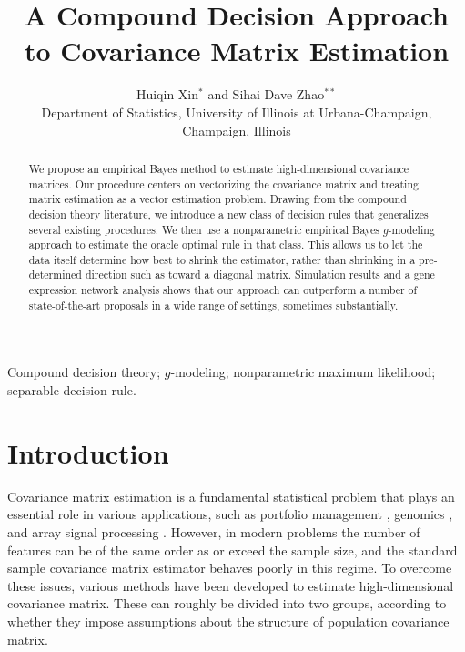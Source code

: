 \documentclass[useAMS,referee,usenatbib]{biom}
\title[Empirical Bayes Covariance Matrix Estimation]{A Compound Decision Approach to Covariance Matrix Estimation}
\author{Huiqin Xin$^{*}$\email{huiqinx2@illinois.edu } and
Sihai Dave Zhao$^{**}$\email{sdzhao@illinois.edu} \\
Department of Statistics, University of Illinois at Urbana-Champaign, Champaign, Illinois}
\begin{document}

\label{firstpage}
\begin{abstract}
  We propose an empirical Bayes method to estimate high-dimensional covariance matrices. Our procedure centers on vectorizing the covariance matrix and treating matrix estimation as a vector estimation problem. Drawing from the compound decision theory literature, we introduce a new class of decision rules that generalizes several existing procedures. We then use a nonparametric empirical Bayes $g$-modeling approach to estimate the oracle optimal rule in that class. This allows us to let the data itself determine how best to shrink the estimator, rather than shrinking in a pre-determined direction such as toward a diagonal matrix. Simulation results and a gene expression network analysis shows that our approach can outperform a number of state-of-the-art proposals in a wide range of settings, sometimes substantially.
\end{abstract}

\begin{keywords}
Compound decision theory; $g$-modeling; nonparametric maximum likelihood; separable decision rule.
\end{keywords}

\maketitle

\section{Introduction}
\label{introduction}

Covariance matrix estimation is a fundamental statistical problem that plays an essential role in various applications, such as portfolio management \citep{ledoit2003improved}, genomics \citep{schafer2005shrinkage}, and array signal processing \citep{abramovich2001locally}. However, in modern problems the number of features can be of the same order as or exceed the sample size, and the standard sample covariance matrix estimator behaves poorly in this regime. To overcome these issues, various methods have been developed to estimate high-dimensional covariance matrix. These can roughly be divided into two groups, according to whether they impose assumptions about the structure of population covariance matrix.
\end{document}
